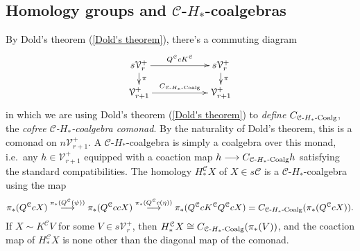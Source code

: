 \documentclass[11pt]{amsart}
\theoremstyle{plain}
\theoremstyle{definition}
\renewcommand{\to}{\longrightarrow}
\newcommand{\calC}{\mathcal{C}}
\newcommand{\calV}{\mathcal{V}}
\newcommand{\calc}{\mathcal{C}}
\theoremstyle{plain}
\newcommand{\vect}[2]{\calV^{#1}_{#2}}
\newcommand{\HCoalg}{\textup{-$H_*$-Coalg}}
\begin{document}
\begin{CPiAlgs and CHalgs}
\subsection{Homology groups and $\calC$-$H_*$-coalgebras}\label{homology and Hcoalgs}
By Dold's theorem (\ref{Dold's theorem}), there's a commuting diagram
\[\xymatrix@R=4mm@C=20mm{
s\vect{+}{r}\ar[r]^-{Q^\calc cK^\calc }
\ar[d]^-{\pi}
&%
s\vect{+}{r}\ar[d]^-{\pi}
\\%
\vect{+}{r+1}\ar[r]^-{C_{\calc\HCoalg}}
&
\vect{+}{r+1}
}\]
in which we are using Dold's theorem (\ref{Dold's theorem}) to \emph{define} $C_{\calc\HCoalg}$, the \emph{cofree $\calc$-$H_*$-coalgebra comonad}.
By the naturality of Dold's theorem, this is a comonad on $n\vect{+}{r+1}$. A $\calc$-$H_*$-coalgebra is simply a coalgebra over this monad, i.e.\ any $h\in\vect{+}{r+1}$ equipped with a coaction map $h\to C_{\calc\HCoalg}h$ satisfying the standard compatibilities. The homology $H_*^\calc X$ of $X\in s\calc$ is a $\calc$-$H_*$-coalgebra using the map
\[\pi_*(Q^{\calc}cX)\overset{\pi_*(Q^{\calc}(\psi))}{\to}\pi_*(Q^{\calc}ccX)\overset{\pi_*(Q^{\calc}c(\eta))}{\to}\pi_*(Q^{\calc}cK^{\calc}Q^{\calc}cX)=C_{\calc\HCoalg}(\pi_*(Q^{\calc}cX)).\]
If $X\sim K^{\calc}V$ for some $V\in s\vect{+}{r}$, then $H_*^{\calc}X\cong C_{\calc\HCoalg}(\pi_*(V))$, and the coaction map of $H_*^{\calc}X$ is none other than the diagonal map of the comonad.


\end{CPiAlgs and CHalgs}
\end{document}
